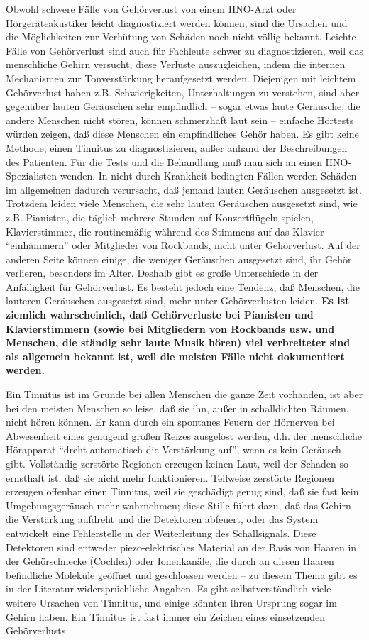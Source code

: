 Obwohl schwere Fälle von Gehörverlust von einem HNO-Arzt oder Hörgeräteakustiker leicht diagnostiziert werden können, sind die Ursachen und die Möglichkeiten zur Verhütung von Schäden noch nicht völlig bekannt.
Leichte Fälle von Gehörverlust sind auch für Fachleute schwer zu diagnostizieren, weil das menschliche Gehirn versucht, diese Verluste auszugleichen, indem die internen Mechanismen zur Tonverstärkung heraufgesetzt werden.
Diejenigen mit leichtem Gehörverlust haben z.B. Schwierigkeiten, Unterhaltungen zu verstehen, sind aber gegenüber lauten Geräuschen sehr empfindlich -- sogar etwas laute Geräusche, die andere Menschen nicht stören, können schmerzhaft laut sein -- einfache Hörtests würden zeigen, daß diese Menschen ein empfindliches Gehör haben.
Es gibt keine Methode, einen Tinnitus zu diagnostizieren, außer anhand der Beschreibungen des Patienten.
Für die Tests und die Behandlung muß man sich an einen HNO-Spezialisten wenden.
In nicht durch Krankheit bedingten Fällen werden Schäden im  allgemeinen dadurch verursacht, daß jemand lauten  Geräuschen ausgesetzt ist.
Trotzdem leiden viele Menschen, die sehr lauten Geräuschen ausgesetzt sind, wie z.B. Pianisten, die täglich mehrere Stunden auf Konzertflügeln spielen, Klavierstimmer, die routinemäßig während des Stimmens auf das Klavier \enquote{einhämmern} oder Mitglieder von Rockbands, nicht unter Gehörverlust.
Auf der anderen Seite können einige, die weniger Geräuschen ausgesetzt sind, ihr Gehör verlieren, besonders im Alter.
Deshalb gibt es große Unterschiede in der Anfälligkeit für Gehörverlust.
Es besteht jedoch eine Tendenz, daß Menschen, die lauteren Geräuschen ausgesetzt sind, mehr unter Gehörverlusten leiden.
\textbf{Es ist ziemlich wahrscheinlich, daß Gehörverluste bei Pianisten und Klavierstimmern (sowie bei Mitgliedern von Rockbands usw. und Menschen, die ständig sehr laute Musik hören) viel verbreiteter sind als allgemein bekannt ist, weil die meisten Fälle nicht dokumentiert werden.}

Ein Tinnitus ist im Grunde bei allen Menschen die ganze Zeit vorhanden, ist aber bei den meisten Menschen so leise, daß sie ihn, außer in schalldichten Räumen, nicht hören können.
Er kann durch ein spontanes Feuern der Hörnerven bei Abwesenheit eines genügend großen Reizes ausgelöst werden, d.h. der menschliche Hörapparat \enquote{dreht automatisch die Verstärkung auf}, wenn es kein Geräusch gibt.
Vollständig zerstörte Regionen erzeugen keinen Laut, weil der Schaden so ernsthaft ist, daß sie nicht mehr funktionieren.
Teilweise zerstörte Regionen erzeugen offenbar einen Tinnitus, weil sie geschädigt genug sind, daß sie fast kein Umgebungsgeräusch mehr wahrnehmen; diese Stille führt dazu, daß das Gehirn die Verstärkung aufdreht und die Detektoren abfeuert, oder das System entwickelt eine Fehlerstelle in der Weiterleitung des Schallsignals.
Diese Detektoren sind entweder piezo-elektrisches Material an der Basis von Haaren in der Gehörschnecke (Cochlea) oder Ionenkanäle, die durch an diesen Haaren befindliche Moleküle geöffnet und geschlossen werden -- zu diesem Thema gibt es in der Literatur widersprüchliche Angaben.
Es gibt selbstverständlich viele weitere Ursachen von Tinnitus, und einige könnten ihren Ursprung sogar im Gehirn haben.
Ein Tinnitus ist fast immer ein Zeichen eines einsetzenden Gehörverlusts.

